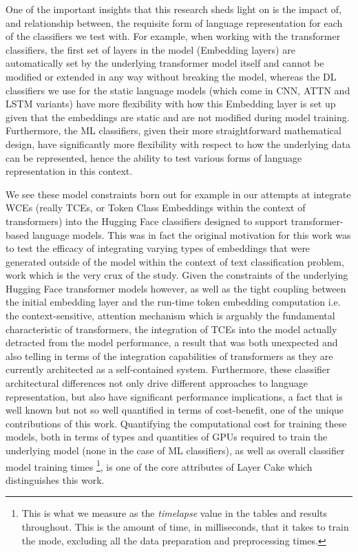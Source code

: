 \documentclass[final]{clv2025-revised}
\begin{document}
One of the important insights that this research sheds light on is the impact of, and relationship between, the requisite form of language representation for each of the classifiers we test with. For example, when working with the transformer classifiers, the first set of layers in the model (Embedding layers) are automatically set by the underlying transformer model itself and cannot be modified or extended in any way without breaking the model, whereas the DL classifiers we use for the static language models (which come in CNN, ATTN and LSTM variants) have more flexibility with how this Embedding layer is set up given that the embeddings are static and are not modified during model training. Furthermore, the ML classifiers, given their more straightforward mathematical design, have significantly more flexibility with respect to how the underlying data can be represented, hence the ability to test various forms of language representation in this context. 

We see these model constraints born out for example in our attempts at integrate WCEs (really TCEs, or Token Class Embeddings within the context of transformers) into the Hugging Face classifiers designed to support transformer-based language models. This was in fact the original motivation for this work was to test the efficacy of integrating varying types of embeddings that were generated outside of the model within the context of text classification problem, work which is the very crux of the \cite{moreo2021} study. Given the constraints of the underlying Hugging Face transformer models however, as well as the tight coupling between the initial embedding layer and the run-time token embedding computation i.e. the context-sensitive, attention mechanism which is arguably the fundamental characteristic of transformers, the integration of TCEs into the model actually detracted from the model performance, a result that was both unexpected and also telling in terms of the integration capabilities of transformers as they are currently architected as a self-contained system. Furthermore, these classifier architectural differences not only drive different approaches to language representation, but also have significant performance implications, a fact that is well known but not so well quantified in terms of cost-benefit, one of the unique contributions of this work. Quantifying the computational cost for training these models, both in terms of types and quantities of GPUs required to train the underlying model (none in the case of ML classifiers), as well as overall classifier model training times \footnote{This is what we measure as the \textit{timelapse} value in the tables and results throughout. This is the amount of time, in milliseconds, that it takes to train the mode, excluding all the data preparation and preprocessing times.}, is one of the core attributes of Layer Cake which distinguishes this work.
\end{document}
